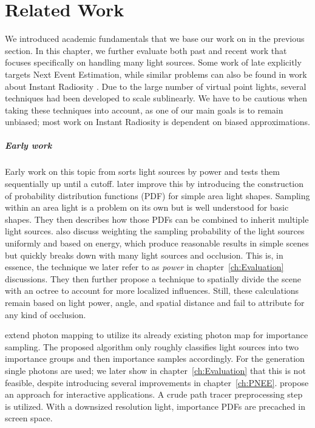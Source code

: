 \chapter{Related Work}
\label{ch:Prev}

We introduced academic fundamentals that we base our work on in the previous section. In this chapter, we further evaluate both past and recent work that focuses specifically on handling many light sources. Some work of late explicitly targets Next Event Estimation, while similar problems can also be found in work about Instant Radiosity \parencite{keller1997instant, Walter2005LightcutsAS, dachsbacher2014scalable}. Due to the large number of virtual point lights, several techniques had been developed to scale sublinearly. We have to be cautious when taking these techniques into account, as one of our main goals is to remain unbiased; most work on Instant Radiosity is dependent on biased approximations.

\paragraph{Early work}

Early work on this topic from \textcite{ward1994adaptive} sorts light sources by power and tests them sequentially up until a cutoff.  \textcite{Shirley:1996:MCT:226150.226151} later improve this by introducing the construction of probability distribution functions (PDF) for simple area light shapes. Sampling within an area light is a problem on its own but is well understood for basic shapes. They then describes how those PDFs can be combined to inherit multiple light sources. \citeauthor{Shirley:1996:MCT:226150.226151} also discuss weighting the sampling probability of the light sources uniformly and based on energy, which produce reasonable results in simple scenes but quickly breaks down with many light sources and occlusion. This is, in essence, the technique we later refer to as \textit{power} in chapter~\ref{ch:Evaluation} discussions. They then further propose a technique to spatially divide the scene with an octree to account for more localized influences. Still, these calculations remain based on light power, angle, and spatial distance and fail to attribute for any kind of occlusion.

\textcite{DBLP:conf/vmv/KellerW00} extend photon mapping to utilize its already existing photon map for importance sampling. The proposed algorithm only roughly classifies light sources into two importance groups and then importance samples accordingly. For the generation single photons are used; we later show in chapter~\ref{ch:Evaluation} that this is not feasible, despite introducing several improvements in chapter~\ref{ch:PNEE}. \textcite{DBLP:conf/rt/WaldBS03} propose an approach for interactive applications. A crude path tracer preprocessing step is utilized. With a downsized resolution light, importance PDFs are precached in screen space. 


